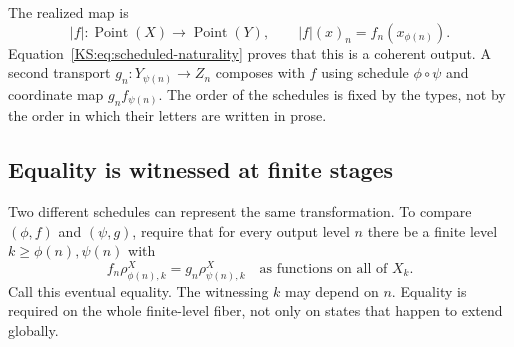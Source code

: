 The realized map is
\[
 |f|:\operatorname{Point}(X)\to\operatorname{Point}(Y),\qquad
 |f|(x)_n=f_n(x_{\phi(n)}).
\]
Equation~\eqref{KS:eq:scheduled-naturality} proves that this is a coherent output. A second transport \(g_n:Y_{\psi(n)}\to Z_n\) composes with \(f\) using schedule \(\phi\circ\psi\) and coordinate map \(g_n f_{\psi(n)}\). The order of the schedules is fixed by the types, not by the order in which their letters are written in prose.

\subsection{Equality is witnessed at finite stages}
Two different schedules can represent the same transformation. To compare \((\phi,f)\) and \((\psi,g)\), require that for every output level \(n\) there be a finite level \(k\ge\phi(n),\psi(n)\) with
\begin{equation}\label{KS:eq:eventual-equality}
 f_n\rho^X_{\phi(n),k}=g_n\rho^X_{\psi(n),k}
 \quad\text{as functions on all of }X_k.
\end{equation}
Call this eventual equality. The witnessing \(k\) may depend on \(n\). Equality is required on the whole finite-level fiber, not only on states that happen to extend globally.


